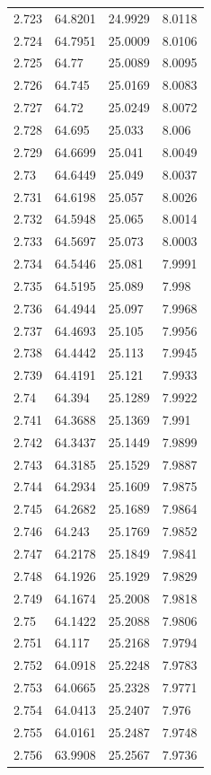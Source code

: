 \begin{tabular}{llll}
2.723 & 64.8201 & 24.9929 & 8.0118 \\
2.724 & 64.7951 & 25.0009 & 8.0106 \\
2.725 & 64.77 & 25.0089 & 8.0095 \\
2.726 & 64.745 & 25.0169 & 8.0083 \\
2.727 & 64.72 & 25.0249 & 8.0072 \\
2.728 & 64.695 & 25.033 & 8.006 \\
2.729 & 64.6699 & 25.041 & 8.0049 \\
2.73 & 64.6449 & 25.049 & 8.0037 \\
2.731 & 64.6198 & 25.057 & 8.0026 \\
2.732 & 64.5948 & 25.065 & 8.0014 \\
2.733 & 64.5697 & 25.073 & 8.0003 \\
2.734 & 64.5446 & 25.081 & 7.9991 \\
2.735 & 64.5195 & 25.089 & 7.998 \\
2.736 & 64.4944 & 25.097 & 7.9968 \\
2.737 & 64.4693 & 25.105 & 7.9956 \\
2.738 & 64.4442 & 25.113 & 7.9945 \\
2.739 & 64.4191 & 25.121 & 7.9933 \\
2.74 & 64.394 & 25.1289 & 7.9922 \\
2.741 & 64.3688 & 25.1369 & 7.991 \\
2.742 & 64.3437 & 25.1449 & 7.9899 \\
2.743 & 64.3185 & 25.1529 & 7.9887 \\
2.744 & 64.2934 & 25.1609 & 7.9875 \\
2.745 & 64.2682 & 25.1689 & 7.9864 \\
2.746 & 64.243 & 25.1769 & 7.9852 \\
2.747 & 64.2178 & 25.1849 & 7.9841 \\
2.748 & 64.1926 & 25.1929 & 7.9829 \\
2.749 & 64.1674 & 25.2008 & 7.9818 \\
2.75 & 64.1422 & 25.2088 & 7.9806 \\
2.751 & 64.117 & 25.2168 & 7.9794 \\
2.752 & 64.0918 & 25.2248 & 7.9783 \\
2.753 & 64.0665 & 25.2328 & 7.9771 \\
2.754 & 64.0413 & 25.2407 & 7.976 \\
2.755 & 64.0161 & 25.2487 & 7.9748 \\
2.756 & 63.9908 & 25.2567 & 7.9736 \\

\end{tabular}
